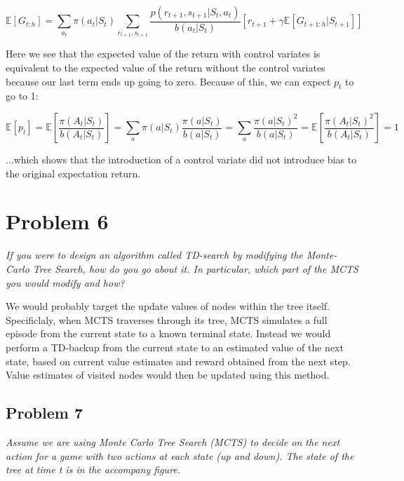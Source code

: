 \documentclass{article}
\begin{document}
\begin{equation}
    \mathbb{E}[G_{t:h}] = \sum_{a_t}\pi(a_t|S_t)\sum_{r_{t+1},s_{t+1}}\frac{p(r_{t+1},s_{t+1}|S_t,a_t)}{b(a_t|S_t)}[r_{t+1} + \gamma \mathbb{E}[G_{t+1:h}|S_{t+1}]]
\end{equation}

Here we see that the expected value of the return with control variates is equivalent to the expected value of the return without the control variates because our last term ends up going to zero. Because of this, we can expect $p_t$ to go to 1:

\begin{equation}
    \mathbb{E}[p_t] = \mathbb{E}\left[\frac{\pi(A_t|S_t)}{b(A_t|S_t)}\right]
    = \sum_{a}\pi(a|S_t)\frac{\pi(a|S_t)}{b(a|S_t)}
    = \sum_{a}\frac{\pi(a|S_t)^2}{b(a|S_t)}
    = \mathbb{E}\left[\frac{\pi(A_t|S_t)^2}{b(A_t|S_t)}\right]
    = 1
\end{equation}

...which shows that the introduction of a control variate did not introduce bias to the original expectation return.


\section*{Problem 6}

\textit{If you were to design an algorithm called TD-search by modifying the Monte-Carlo Tree Search, how do you go about it. In particular, which part of the MCTS you would modify and how?}

We would probably target the update values of nodes within the tree itself. Specificlaly, when MCTS traverses through its tree, MCTS simulates a full episode from the current state to a known terminal state. Instead we would perform a TD-backup from the current state to an estimated value of the next state, based on current value estimates and reward obtained from the next step. Value estimates of visited nodes would then be updated using this method.


\subsection*{Problem 7}

\textit{Assume we are using Monte Carlo Tree Search (MCTS) to decide on the next action for a game with two actions at each state (up and down). The state of the tree at time t is in the accompany figure.}
\end{document}
